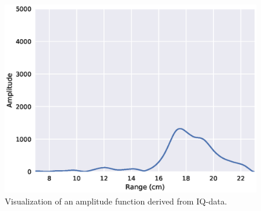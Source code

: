 

\begin{figure}[t]
	\centering
	\includegraphics[scale=0.7]{figs_temp/single_sweep_iq}
	\caption{Visualization of an amplitude function derived from IQ-data.}
	\label{fig:single_sweep_iq}
\end{figure}












%
%

